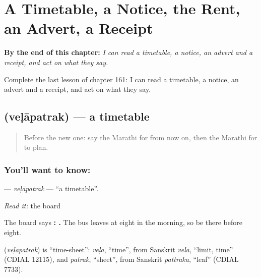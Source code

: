 
\chapter{A Timetable, a Notice, the Rent, an Advert, a Receipt}
\label{ch:mr-a-timetable-a-notice-the-rent-an-advert-a-receipt}

\begin{chapteropening}
\textbf{By the end of this chapter:} \emph{I can read a timetable, a notice, an advert and a receipt, and act on what they say.}

Complete the last lesson of chapter 161: I can read a timetable, a notice, an advert and a receipt, and act on what they say.
\end{chapteropening}

\section[\texorpdfstring{\mr{वेळापत्रक} (veḷāpatrak)}{वेळापत्रक (veḷāpatrak)}]{ (veḷāpatrak) — a timetable}

\label{lesson:MR-C161-velapatrak}



\begin{quote}
Before the new one: say the Marathi for from now on, then the Marathi for to plan.
\end{quote}

\subsection*{You'll want to know: }
\textbf{} — \emph{veḷāpatrak} — \textquotedblleft{}a timetable\textquotedblright{}.

\emph{Read it:} the board

The board says \textbf{:   .} The bus leaves at eight in the morning, so be there before eight.

\begin{cousinweb}
\textbf{} (\emph{veḷāpatrak}) is \textquotedblleft{}time-sheet\textquotedblright{}: \emph{veḷā}, \textquotedblleft{}time\textquotedblright{}, from Sanskrit \emph{velā}, \textquotedblleft{}limit, time\textquotedblright{} (CDIAL 12115), and \emph{patrak}, \textquotedblleft{}sheet\textquotedblright{}, from Sanskrit \emph{pattraka}, \textquotedblleft{}leaf\textquotedblright{} (CDIAL 7733).
\end{cousinweb}

